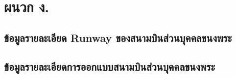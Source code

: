 
\chapter{ผนวก ง.}

\section{ข้อมูลรายละเอียด Runway ของสนามบินส่วนบุคคลขนงพระ} \label{ข้อมูลรายละเอียด Runway ของสนามบินส่วนบุคคลขนงพระ}



\section{ข้อมูลรายละเอียดการออกแบบสนามบินส่วนบุคคลขนงพระ} \label{ข้อมูลรายละเอียดการออกแบบสนามบินส่วนบุคคลขนงพระ}

